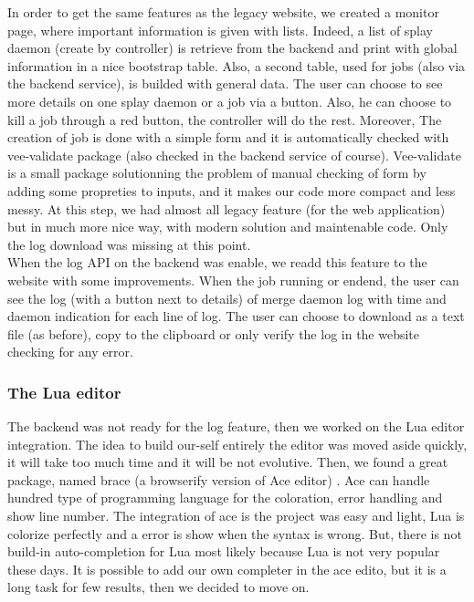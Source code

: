 \documentclass{eplmastersthesis}
\begin{document}
        In order to get the same features as the legacy website, we created a
        monitor page, where important information is given with lists. Indeed,
        a list of splay daemon (create by controller) is retrieve from the
        backend and print with global information in a nice bootstrap table.
        Also, a second table, used for jobs (also via the backend service), is
        builded with general data. The user can choose to see more details on
        one splay daemon or a job via a button. Also, he can choose to kill a
        job through a red button, the controller will do the rest. Moreover, The creation of job is done
        with a simple form and it is automatically checked with vee-validate
        package \cite{VeeValidate} (also checked in the backend service of
        course). Vee-validate is a small package solutionning the problem of
        manual checking of form by adding some propreties to inputs, and it
        makes our code more compact and less messy. At this step, we had
        almost all legacy feature (for the web application) but in much more
        nice way, with modern solution and maintenable code. Only the log
        download was missing at this point. \\

        When the log API on the backend was enable, we readd this feature to the website with some
        improvements. When the job running or endend, the user can see the log (with a button next to details)
        of merge daemon log with time and daemon indication for each line of log. The user can choose to
        download as a text file (as before), copy to the clipboard or only verify the log in
        the website checking for any error. \\

        \subsubsection{The Lua editor}
        The backend was not ready for the log feature, then we worked on the Lua editor
        integration. The idea to build our-self entirely the editor was moved aside quickly,
        it will take too much time and it will be not evolutive. Then, we found a
        great package, named brace (a browserify version of Ace editor) \cite{Ace}. Ace
        can handle hundred type of programming language for the coloration, error handling and
        show line number. The integration of ace is the project was easy and light, Lua is
        colorize perfectly and a error is show when the syntax is wrong. But, there is not
        build-in auto-completion for Lua most likely because Lua is not very popular these days.
        It is possible to add our own completer in the ace edito, but it is a long task
        for few results, then we decided to move on. \\
\end{document}
